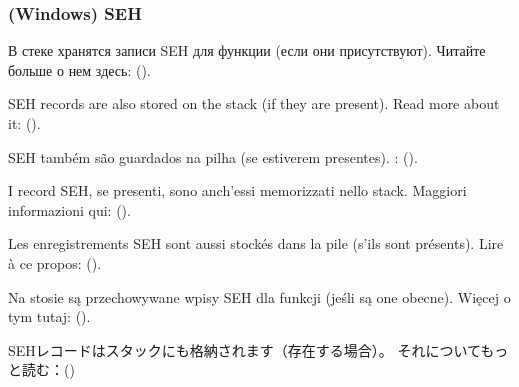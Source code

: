 \subsubsection{(Windows) SEH}

\ifdefined\RUSSIAN
В стеке хранятся записи \ac{SEH} для функции (если они присутствуют).
Читайте больше о нем здесь: ().
\fi %

\ifdefined\ENGLISH
\ac{SEH} records are also stored on the stack (if they are present).
Read more about it: ().
\fi %

\ifdefined\BRAZILIAN
\ac{SEH} também são guardados na pilha (se estiverem presentes).
\PTBRph{}: ().
\fi %

\ifdefined\ITALIAN
I record \ac{SEH}, se presenti, sono anch'essi memorizzati nello stack.
Maggiori informazioni qui: ().
\fi %

\ifdefined\FRENCH
Les enregistrements \ac{SEH} sont aussi stockés dans la pile (s'ils sont présents).
Lire à ce propos: ().
\fi %


\ifdefined\POLISH
Na stosie są przechowywane wpisy \ac{SEH} dla funkcji (jeśli są one obecne).
Więcej o tym tutaj: ().
\fi %

\ifdefined\JAPANESE
\ac{SEH}レコードはスタックにも格納されます（存在する場合）。
それについてもっと読む：()
\fi %
